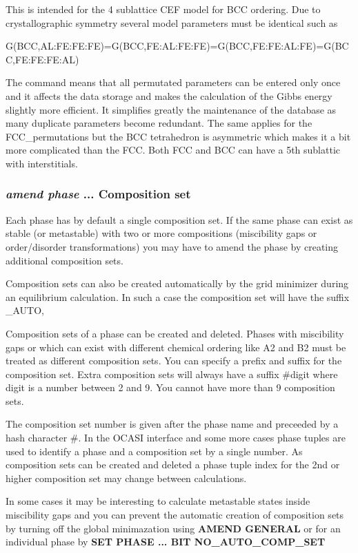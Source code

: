 \documentclass[11pt]{article}
\begin{document}
This is intended for the 4 sublattice CEF model for BCC ordering.  Due
to crystallographic symmetry several model parameters must be
identical such as

G(BCC,AL:FE:FE:FE)=G(BCC,FE:AL:FE:FE)=G(BCC,FE:FE:AL:FE)=G(BCC,FE:FE:FE:AL)

The command means that all permutated parameters can be entered only
once and it affects the data storage and makes the calculation of the
Gibbs energy slightly more efficient.  It simplifies greatly the
maintenance of the database as many duplicate parameters become
redundant.  The same applies for the FCC\_permutations but the BCC
tetrahedron is asymmetric which makes it a bit more complicated than
the FCC.  Both FCC and BCC can have a 5th sublattic with
interstitials.

\hypertarget{Add new cs}{}
\subsubsection{{\em amend phase} ... Composition set}\label{sc:amend_phase_cs}

Each phase has by default a single composition set.  If the same phase
can exist as stable (or metastable) with two or more compositions
(miscibility gaps or order/disorder transformations) you may have to
amend the phase by creating additional composition sets.  

Composition sets can also be created automatically by the grid
minimizer during an equilibrium calculation.  In such a case the
composition set will have the suffix \_AUTO,

Composition sets of a phase can be created and deleted.  Phases with
miscibility gaps or which can exist with different chemical ordering
like A2 and B2 must be treated as different composition sets.  You can
specify a prefix and suffix for the composition set.  Extra
composition sets will always have a suffix \#digit where digit is a
number between 2 and 9.  You cannot have more than 9 composition sets.

The composition set number is given after the phase name and preceeded
by a hash character \#.  In the OCASI interface and some more cases
phase tuples are used to identify a phase and a composition set by a
single number.  As composition sets can be created and deleted a phase
tuple index for the 2nd or higher composition set may change between
calculations.

In some cases it may be interesting to calculate metastable states
inside miscibility gaps and you can prevent the automatic creation of
composition sets by turning off the global minimazation using {\bf
  AMEND GENERAL} or for an individual phase by {\bf SET PHASE ... BIT
  NO\_AUTO\_COMP\_SET}
\end{document}
